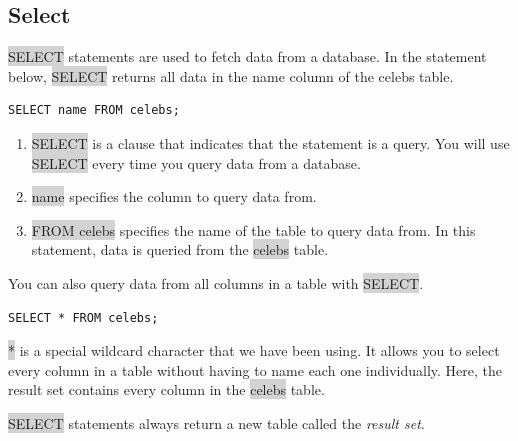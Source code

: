 \documentclass[11pt]{article}
\begin{document}
\subsection{Select} 
\colorbox{lightgray}{SELECT} statements are used to fetch data from a database. In the statement below, \colorbox{lightgray}{SELECT} returns all data in the name column of the celebs table.
\begin{lstlisting}
SELECT name FROM celebs;
\end{lstlisting}
\begin{enumerate}[leftmargin = *]
\item \colorbox{lightgray}{SELECT} is a clause that indicates that the statement is a query. You will use \colorbox{lightgray}{SELECT} every time you query data from a database.
\item \colorbox{lightgray}{name} specifies the column to query data from.
\item \colorbox{lightgray}{FROM celebs} specifies the name of the table to query data from. In this statement, data is queried from the \colorbox{lightgray}{celebs} table.
\end{enumerate}
You can also query data from all columns in a table with \colorbox{lightgray}{SELECT}.
\begin{lstlisting}
SELECT * FROM celebs;
\end{lstlisting}
\colorbox{lightgray}{*} is a special wildcard character that we have been using. It allows you to select every column in a table without having to name each one individually. Here, the result set contains every column in the \colorbox{lightgray}{celebs} table.

\colorbox{lightgray}{SELECT} statements always return a new table called the \textit{result set}.
\end{document}

